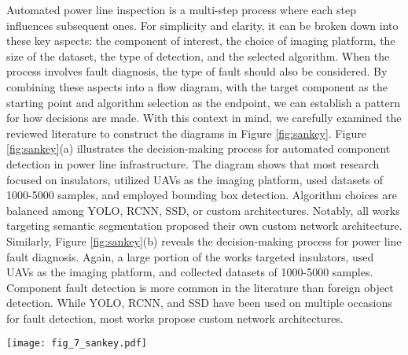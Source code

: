 Automated power line inspection is a multi-step process where each step influences subsequent ones. For simplicity and clarity, it can be broken down into these key aspects: the component of interest, the choice of imaging platform, the size of the dataset, the type of detection, and the selected algorithm. When the process involves fault diagnosis, the type of fault should also be considered. By combining these aspects into a flow diagram, with the target component as the starting point and algorithm selection as the endpoint, we can establish a pattern for how decisions are made. With this context in mind, we carefully examined the reviewed literature to construct the diagrams in Figure \ref{fig:sankey}. Figure \ref{fig:sankey}(a) illustrates the decision-making process for automated component detection in power line infrastructure. The diagram shows that most research focused on insulators, utilized UAVs as the imaging platform, used datasets of 1000-5000 samples, and employed bounding box detection. Algorithm choices are balanced among YOLO, RCNN, SSD, or custom architectures. Notably, all works targeting semantic segmentation proposed their own custom network architecture. Similarly, Figure \ref{fig:sankey}(b) reveals the decision-making process for power line fault diagnosis. Again, a large portion of the works targeted insulators, used UAVs as the imaging platform, and collected datasets of 1000-5000 samples. Component fault detection is more common in the literature than foreign object detection. While YOLO, RCNN, and SSD have been used on multiple occasions for fault detection, most works propose custom network architectures.

\begin{figure*}[!ht]
    \centering
    \texttt{[image: fig\_7\_sankey.pdf]}
    \caption{(a) The inter-relation between the different aspects in power line component detection. (b) The inter-relation between the different aspects in power line fault diagnosis.}
    \label{fig:sankey}
\end{figure*}